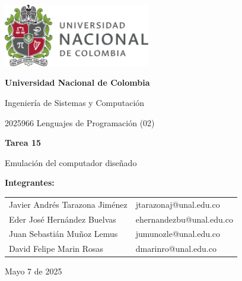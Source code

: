\documentclass{article}
\begin{document}
\begin{titlepage}
  \centering
  \includegraphics[width=0.48\textwidth]{logo_universidad.png}
  \par\vspace{2cm}

  {\Large \textbf{Universidad Nacional de Colombia} \par}
  \vspace{0.5cm}
  {\large Ingeniería de Sistemas y Computación \par}
  {\large 2025966 Lenguajes de Programación (02)\par}
  \vspace{3cm}

  {\large \textbf{Tarea 15} \par}
  {\large Emulación del computador diseñado\par}
  \vspace{3cm}

  {\large \textbf{Integrantes:} \par}
  \vspace{0.5cm}
  \begin{tabular}{ll}
    Javier Andrés Tarazona Jiménez & jtarazonaj@unal.edu.co \\
    Eder  José Hernández Buelvas   & ehernandezbu@unal.edu.co \\
    Juan Sebastián Muñoz Lemus     & jumunozle@unal.edu.co   \\
    David Felipe Marin Rosas       & dmarinro@unal.edu.co   \\
  \end{tabular}
  \par\vspace{3cm}

  {\large Mayo 7 de 2025 \par}
\end{titlepage}

\tableofcontents %

\newpage %
\end{document}
